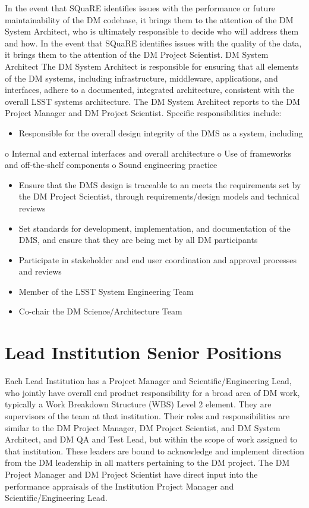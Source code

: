 In the event that SQuaRE identifies issues with the performance or future maintainability of the DM codebase, it brings them to the attention of the DM System Architect, who is ultimately responsible to decide who will address them and how. In the event that SQuaRE identifies issues with the quality of the data, it brings them to the attention of the DM Project Scientist. 
DM System Architect
The DM System Architect is responsible for ensuring that all elements of the DM systems, including infrastructure, middleware, applications, and interfaces, adhere to a documented, integrated architecture, consistent with the overall LSST systems architecture.  The DM System Architect reports to the DM Project Manager and DM Project Scientist. Specific responsibilities include:
\begin{itemize}
\item Responsible for the overall design integrity of the DMS as a system, including
\end{itemize}
o Internal and external interfaces and overall architecture
o Use of frameworks and off-the-shelf components
o Sound engineering practice
\begin{itemize}
\item Ensure that the DMS design is traceable to an meets the requirements set by the DM Project Scientist, through requirements/design models and technical reviews
\item Set standards for development, implementation, and documentation of the DMS, and ensure that they are being met by all DM participants
\item Participate in stakeholder and end user coordination and approval processes and reviews
\item Member of the LSST System Engineering Team
\item Co-chair the DM Science/Architecture Team
\end{itemize}


\section{Lead Institution Senior Positions}
Each Lead Institution has a Project Manager and Scientific/Engineering Lead, who jointly have overall end product responsibility for a broad area of DM work, typically a Work Breakdown Structure (WBS) Level 2 element. They are supervisors of the team at that institution.  Their roles and responsibilities are similar to the DM Project Manager, DM Project Scientist, and DM System Architect, and DM QA and Test Lead, but within the scope of work assigned to that institution.  These leaders are bound to acknowledge and implement direction from the DM leadership in all matters pertaining to the DM project.  The DM Project Manager and DM Project Scientist have direct input into the performance appraisals of the Institution Project Manager and Scientific/Engineering Lead. 

